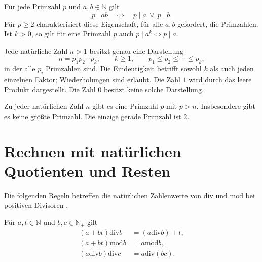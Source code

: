 \begin{theorem}
\label{b10guide:thm:euclid-lemma}
Für jede Primzahl $p$ und $a,b\in\mathbb N$ gilt
\[
 p\mid ab\quad\Longleftrightarrow\quad p\mid a\ \lor\ p\mid b.
\]
Für $p\ge2$ charakterisiert diese Eigenschaft, für alle $a,b$
gefordert, die Primzahlen. Ist $k>0$, so gilt für eine Primzahl $p$
auch $p\mid a^k\Longleftrightarrow p\mid a$.
\end{theorem}

\begin{theorem}
\label{b10guide:thm:factorization}
Jede natürliche Zahl $n>1$ besitzt genau eine Darstellung
\[
 n=p_1p_2\cdots p_k,\qquad
 k\ge1,\qquad p_1\le p_2\le\cdots\le p_k,
\]
in der alle $p_i$ Primzahlen sind. Die Eindeutigkeit betrifft
sowohl $k$ als auch jeden einzelnen Faktor; Wiederholungen sind erlaubt.
Die Zahl $1$ wird durch das leere Produkt dargestellt.
Die Zahl $0$ besitzt keine solche Darstellung.
\end{theorem}

\begin{theorem}
\label{b10guide:thm:infinite-primes}
Zu jeder natürlichen Zahl $n$ gibt es eine Primzahl $p$ mit $p>n$.
Insbesondere gibt es keine größte Primzahl.
Die einzige gerade Primzahl ist $2$.
\end{theorem}

\section{Rechnen mit natürlichen Quotienten und Resten}

Die folgenden Regeln betreffen die natürlichen Zahlenwerte von
$\mathrm{div}$ und $\mathrm{mod}$ bei positiven Divisoren
\cite{natdivmod}.

\begin{theorem}
\label{b10guide:thm:quotient-rules}
Für $a,t\in\mathbb N$ und $b,c\in\mathbb N_+$ gilt
\[
 \begin{aligned}
 (a+bt)\mathbin{\mathrm{div}}b
   &=(a\mathbin{\mathrm{div}}b)+t,\\
 (a+bt)\mathbin{\mathrm{mod}}b&=a\mathbin{\mathrm{mod}}b,\\
 (a\mathbin{\mathrm{div}}b)\mathbin{\mathrm{div}}c
   &=a\mathbin{\mathrm{div}}(bc).
 \end{aligned}
\]
\end{theorem}

